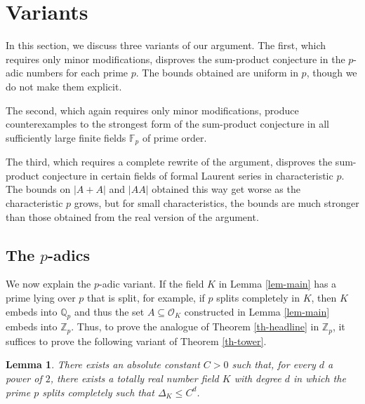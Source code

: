 \documentclass{amsart}
\numberwithin{equation}{section}
\newtheorem{lemma}[theorem]{Lemma}
\begin{document}
\section{Variants}\label{sec-variants}

In this section, we discuss three variants of our argument. The first, which requires only minor modifications, disproves the sum-product conjecture in the $p$-adic numbers for each prime $p$. The bounds obtained are uniform in $p$, though we do not make them explicit.

The second, which again requires only minor modifications, produce counterexamples to the strongest form of the sum-product conjecture in all sufficiently large finite fields $\mathbb F_p$ of prime order.

The third, which requires a complete rewrite of the argument, disproves the sum-product conjecture in certain fields of formal Laurent series in characteristic $p$. The bounds on $|A+A|$ and $|AA|$ obtained this way get worse as the characteristic $p$ grows, but for small characteristics, the bounds are much stronger than those obtained from the real version of the argument.

 
\subsection{The \texorpdfstring{$p$}{p}-adics} We now explain the $p$-adic variant. If the field $K$ in Lemma \ref{lem-main} has a prime lying over $p$ that is split, for example, if $p$ splits completely in $K$, then $K$ embeds into $\mathbb Q_p$ and thus  the set $A \subseteq \mathcal O_K$ constructed in Lemma \ref{lem-main} embeds into $\mathbb Z_p$. Thus, to prove the analogue of Theorem \ref{th-headline} in $\mathbb Z_p$, it suffices to prove the following variant of Theorem \ref{th-tower}.

\begin{lemma}\label{field-existence-split-p}  There exists an absolute constant $C>0$ such that, for every $d$ a power of $2$, there exists a totally real number field $K$ with degree $d$ in which the prime $p$ splits completely such that $\Delta_K\leq C^d$. \end{lemma}
\end{document}
